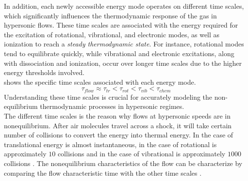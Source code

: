         In addition, each newly accessible energy mode operates on different
        time scales, which significantly influences the thermodynamic response
        of the gas in hypersonic flows. These time scales are associated with
        the energy required for the excitation of rotational, vibrational, and
        electronic modes, as well as ionization to reach a \textit{steady
        thermodynamic state}. For instance, rotational modes
        tend to equilibrate quickly, while vibrational and electronic
        excitations, along with dissociation and ionization, occur over longer
        time scales due to the higher energy thresholds involved. \\

         shows the specific time scales associated with each
        energy mode. 
        \begin{equation}\label{eq:timeScales}
            \tau_{flow} \approx \tau_{tr} < \tau_{rot} <
            \tau_{vib} < \tau_{chem}
        \end{equation}
        Understanding these time scales is crucial for accurately
        modeling the non-equilibrium thermodynamic processes in hypersonic
        regimes.\\

        The different time scales is the reason why flows at hypersonic
        speeds are in nonequilibrium. After air molecules travel across a
        shock, it will take certain number of collisions to convert the
        energy into thermal energy. In the case of translational energy is
        almost instantaneous, in the case of rotational is approximately $10$
        collisions and in the case of vibrational is approximately $1000$
        collisions \cite{Vincenti1975}. The nonequilibrium
        characteristics of the flow can be characterize by comparing the flow
        characteristic time with the other time scales \cite{Neitzel2017}. \\

